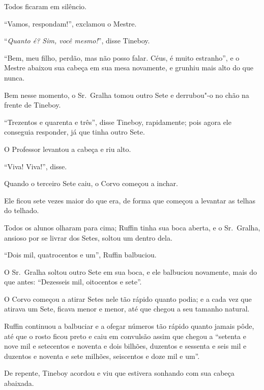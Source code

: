 Todos ficaram em silêncio.

``Vamos, respondam!'', exclamou o Mestre.

``\emph{Quanto é? Sim, você mesmo!}'', disse Tineboy.

``Bem, meu filho, perdão, mas não posso falar. Céus, é muito estranho'',
e o Mestre abaixou sua cabeça em sua mesa novamente, e grunhiu mais alto
do que nunca.

Bem nesse momento, o Sr.~Gralha tomou outro Sete e derrubou"-o no chão na
frente de Tineboy.

``Trezentos e quarenta e três'', disse Tineboy, rapidamente; pois agora
ele conseguia responder, já que tinha outro Sete.

O Professor levantou a cabeça e riu alto.

``Viva! Viva!'', disse.

Quando o terceiro Sete caiu, o Corvo começou a inchar.

Ele ficou sete vezes maior do que era, de forma que começou a levantar
as telhas do telhado.

Todos os alunos olharam para cima; Ruffin tinha sua boca aberta, e o Sr.~Gralha, ansioso por se livrar dos Setes, soltou um dentro dela.

``Dois mil, quatrocentos e um'', Ruffin balbuciou.

O Sr.~Gralha soltou outro Sete em sua boca, e ele balbuciou novamente,
mais do que antes: ``Dezesseis mil, oitocentos e sete''.

O Corvo começou a atirar Setes nele tão rápido quanto podia; e a cada
vez que atirava um Sete, ficava menor e menor, até que chegou a seu
tamanho natural.

Ruffin continuou a balbuciar e a ofegar números tão rápido quanto jamais
pôde, até que o rosto ficou preto e caiu em convulsão assim que
chegou a ``setenta e nove mil e setecentos e noventa e dois bilhões,
duzentos e sessenta e seis mil e duzentos e noventa e sete milhões,
seiscentos e doze mil e um''.

De repente, Tineboy acordou e viu que estivera sonhando com sua cabeça
abaixada.

